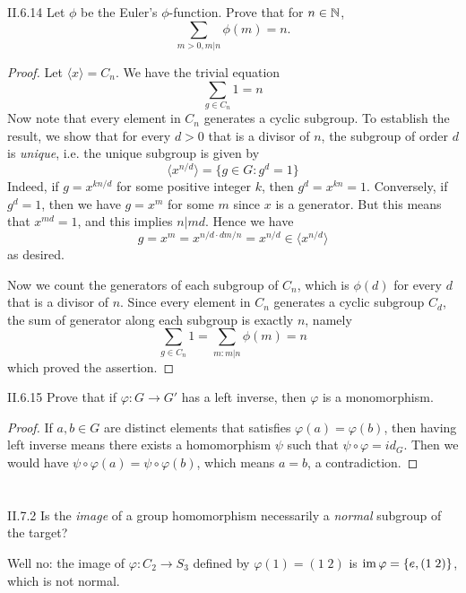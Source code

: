 \begin{problem}{II.6.14}
Let $\phi$ be the Euler's $\phi$-function. Prove that for $n \in \mathbb{N}$, 
\[
\sum_{m>0, m|n} \phi(m) = n.
\]
\end{problem}
\begin{proof}
Let $\langle x \rangle = C_n$. We have the trivial equation 
\[
\sum_{g \in C_n} 1 = n
\]
Now note that every element in $C_n$ generates a cyclic subgroup. To establish the result, we show that for every $d > 0$ that is a divisor of $n$, the subgroup of order $d$ is \emph{unique}, i.e. the unique subgroup is given by
\[
\langle x^{n/d} \rangle = \{g \in G : g^d = 1\}
\]
Indeed, if $g = x^{kn/d}$ for some positive integer $k$, then $g^d = x^{kn} = 1$. Conversely, if $g^d = 1$, then we have $g = x^m$ for some $m$ since $x$ is a generator. But this means that $x^{md} = 1$, and this implies $n|md$. Hence we have
\[
g = x^{m} = x^{n/d \cdot dm/n} = x^{n/d} \in \langle x^{n/d} \rangle
\]
as desired.

Now we count the generators of each subgroup of $C_n$, which is $\phi(d)$ for every $d$ that is a divisor of $n$. Since every element in $C_n$ generates a  cyclic subgroup $C_d$, the sum of generator along each subgroup is exactly $n$, namely
\[
\sum_{g \in C_n} 1 = \sum_{m : m|n} \phi(m) = n
\]
which proved the assertion.
\end{proof}

\begin{problem}{II.6.15}
Prove that if $\varphi:G \to G'$ has a left inverse, then $\varphi$ is a monomorphism.
\end{problem}
\begin{proof}
If $a, b \in G$ are distinct elements that satisfies $\varphi(a) = \varphi(b)$, then having left inverse means there exists a homomorphism $\psi$ such that $\psi \circ \varphi = id_G$. Then we would have $\psi \circ \varphi(a) = \psi \circ \varphi(b)$, which means $a = b$, a contradiction.
\end{proof}

\section{}

\begin{problem}{II.7.2}
Is the \emph{image} of a group homomorphism necessarily a \emph{normal} subgroup of the target?
\end{problem}
\begin{solution}
Well no: the image of $\varphi: C_2 \to S_3$ defined by $\varphi(1) = (1 \; 2)$ is $\operatorname{im} \varphi = \{e,(1 \; 2)\}$, which is not normal.
\end{solution}

